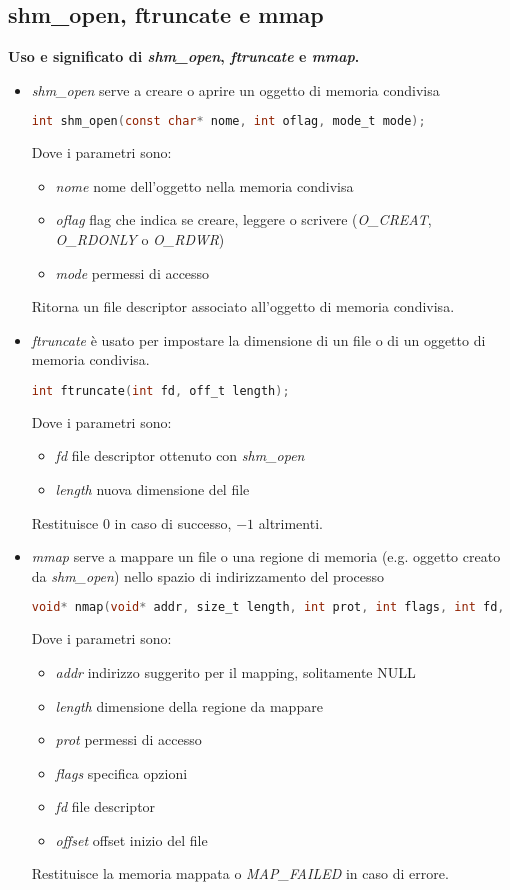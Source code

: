 \documentclass[a4paper,10pt]{article}
\theoremstyle{remark}
\theoremstyle{definition}
\theoremstyle{plain}
\theoremstyle{definition}
\theoremstyle{definition}
\theoremstyle{definition}
\theoremstyle{plain}
\theoremstyle{plain}
\begin{document}
\subsection{shm\_open, ftruncate e mmap}
\textbf{Uso e significato di \textit{shm\_open}, \textit{ftruncate} e \textit{mmap}.}\\
\begin{itemize}
	\item \textit{shm\_open} serve a creare o aprire un oggetto di memoria condivisa
	\begin{lstlisting}[language=C]
		int shm_open(const char* nome, int oflag, mode_t mode);
	\end{lstlisting}
	Dove i parametri sono:
	\begin{itemize}
		\item \textit{nome} nome dell'oggetto nella memoria condivisa
		\item \textit{oflag} flag che indica se creare, leggere o scrivere (\textit{O\_CREAT}, \textit{O\_RDONLY} o \textit{O\_RDWR})
		\item \textit{mode} permessi di accesso
	\end{itemize}
	Ritorna un file descriptor associato all'oggetto di memoria condivisa.
	\item \textit{ftruncate} è usato per impostare la dimensione di un file o di un oggetto di memoria condivisa.
	\begin{lstlisting}[language=C]
		int ftruncate(int fd, off_t length);
	\end{lstlisting}
	Dove i parametri sono:
	\begin{itemize}
		\item \textit{fd} file descriptor ottenuto con \textit{shm\_open}
		\item \textit{length} nuova dimensione del file
	\end{itemize}
	Restituisce $0$ in caso di successo, $-1$ altrimenti.
	\item \textit{mmap} serve a mappare un file o una regione di memoria (e.g. oggetto creato da \textit{shm\_open}) nello spazio di indirizzamento del processo
	\begin{lstlisting}[language=C]
		void* nmap(void* addr, size_t length, int prot, int flags, int fd, off_t offset);
	\end{lstlisting}
	Dove i parametri sono:
	\begin{itemize}
		\item \textit{addr} indirizzo suggerito per il mapping, solitamente NULL
		\item \textit{length} dimensione della regione da mappare
		\item \textit{prot} permessi di accesso
		\item \textit{flags} specifica opzioni
		\item \textit{fd} file descriptor
		\item \textit{offset} offset inizio del file
	\end{itemize}
	Restituisce la memoria mappata o \textit{MAP\_FAILED} in caso di errore.

\end{itemize}
\end{document}
